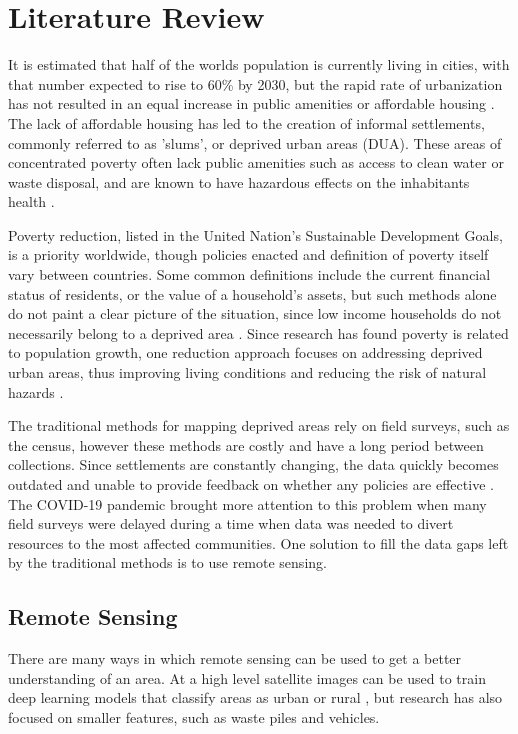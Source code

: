 \documentclass[conference]{IEEEtran}
\begin{document}
	\section{Literature Review}
		It is estimated that half of the worlds population is currently living in cities, with that number expected to rise to 60\% by 2030, but the rapid rate of urbanization has not resulted in an equal increase in public amenities or affordable housing \cite{UN_Sustanability_Report}.
		The lack of affordable housing has led to the creation of informal settlements, commonly referred to as 'slums', or deprived urban areas (DUA).
		These areas of concentrated poverty often lack public amenities such as access to clean water or waste disposal, and are known to have hazardous effects on the inhabitants health \cite{Georgano_Stefanos_2021}.
		
		Poverty reduction, listed in the United Nation's Sustainable Development Goals, is a priority worldwide, though policies enacted and definition of poverty itself vary between countries.
		Some common definitions include the current financial status of residents, or the value of a household's assets, but such methods alone do not paint a clear picture of the situation, since low income households do not necessarily belong to a deprived area \cite{Merodio_Paloma_2021}. 
		Since research has found poverty is related to population growth, one reduction approach focuses on addressing deprived urban areas, thus improving living conditions and reducing the risk of natural hazards \cite{Lin_Li_2021}.
		
		The traditional methods for mapping deprived areas rely on field surveys, such as the census, however these methods are costly and have a long period between collections.
		Since settlements are constantly changing, the data quickly becomes outdated and unable to provide feedback on whether any policies are effective \cite{Williams_Trecia_2020}.
		The COVID-19 pandemic brought more attention to this problem when many field surveys were delayed during a time when data was needed to divert resources to the most affected communities.
		One solution to fill the data gaps left by the traditional methods is to use remote sensing.
		
	\subsection{Remote Sensing}
		There are many ways in which remote sensing can be used to get a better understanding of an area.
		At a high level satellite images can be used to train deep learning models that classify areas as urban or rural \cite{Guo_Jinxin_2019}, but research has also focused on smaller features, such as waste piles and vehicles.
		
\end{document}
